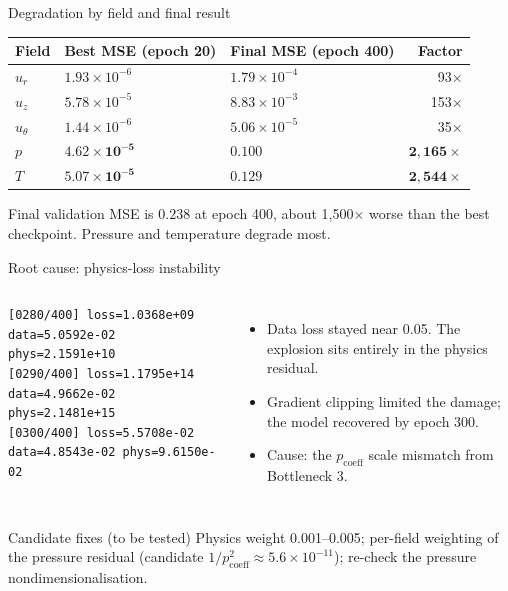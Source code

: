 \documentclass[aspectratio=169]{beamer}
\begin{document}
\begin{frame}{Degradation by field and final result}
\begin{center}
\small
\begin{tabular}{lllr}
\toprule
Field & Best MSE (epoch 20) & Final MSE (epoch 400) & Factor \\
\midrule
$u_r$ & $1.93\times10^{-6}$ & $1.79\times10^{-4}$ & 93$\times$ \\
$u_z$ & $5.78\times10^{-5}$ & $8.83\times10^{-3}$ & 153$\times$ \\
$u_\theta$ & $1.44\times10^{-6}$ & $5.06\times10^{-5}$ & 35$\times$ \\
$p$ & $\mathbf{4.62\times10^{-5}}$ & $\mathbf{0.100}$ & $\mathbf{2{,}165\times}$ \\
$T$ & $\mathbf{5.07\times10^{-5}}$ & $\mathbf{0.129}$ & $\mathbf{2{,}544\times}$ \\
\bottomrule
\end{tabular}
\end{center}
\vspace{0.2cm}
Final validation MSE is $0.238$ at epoch 400, about 1,500$\times$ worse than the best checkpoint. Pressure and temperature degrade most.
\end{frame}

\begin{frame}[fragile]{Root cause: physics-loss instability}
\begin{columns}[T,onlytextwidth]
\scriptsize
\begin{verbatim}
[0280/400] loss=1.0368e+09 data=5.0592e-02 phys=2.1591e+10
[0290/400] loss=1.1795e+14 data=4.9662e-02 phys=2.1481e+15
[0300/400] loss=5.5708e-02 data=4.8543e-02 phys=9.6150e-02
\end{verbatim}
\footnotesize
\begin{itemize}
  \item Data loss stayed near 0.05. The explosion sits entirely in the physics residual.
  \item Gradient clipping limited the damage; the model recovered by epoch 300.
  \item Cause: the $p_{\mathrm{coeff}}$ scale mismatch from Bottleneck 3.
\end{itemize}
\end{columns}
\vspace{0.2cm}
\begin{alertblock}{Candidate fixes (to be tested)}
\footnotesize Physics weight 0.001--0.005; per-field weighting of the pressure residual (candidate $1/p_{\mathrm{coeff}}^2 \approx 5.6\times10^{-11}$); re-check the pressure nondimensionalisation.
\end{alertblock}
\end{frame}
\end{document}
